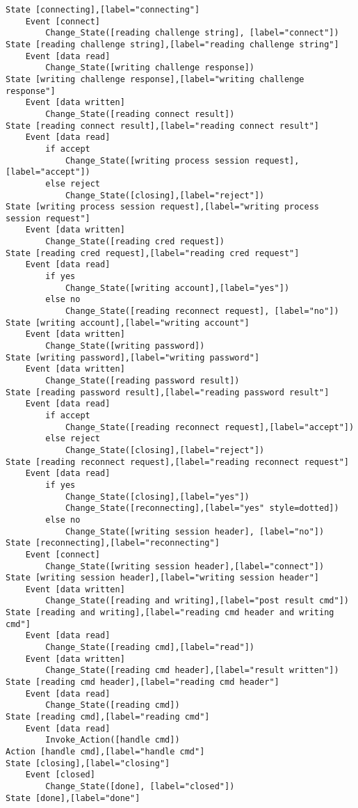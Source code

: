 \begin{comment}
This is the state machine for the smpd connect command.
Graph [smpd connect],
      [size="7.5, 10"]
\end{comment}
\begin{verbatim}
State [connecting],[label="connecting"]
	Event [connect]
		Change_State([reading challenge string], [label="connect"])
State [reading challenge string],[label="reading challenge string"]
	Event [data read]
		Change_State([writing challenge response])
State [writing challenge response],[label="writing challenge response"]
	Event [data written]
		Change_State([reading connect result])
State [reading connect result],[label="reading connect result"]
	Event [data read]
		if accept
			Change_State([writing process session request],[label="accept"])
		else reject
			Change_State([closing],[label="reject"])
State [writing process session request],[label="writing process session request"]
	Event [data written]
		Change_State([reading cred request])
State [reading cred request],[label="reading cred request"]
	Event [data read]
		if yes
			Change_State([writing account],[label="yes"])
		else no
			Change_State([reading reconnect request], [label="no"])
State [writing account],[label="writing account"]
	Event [data written]
		Change_State([writing password])
State [writing password],[label="writing password"]
	Event [data written]
		Change_State([reading password result])
State [reading password result],[label="reading password result"]
	Event [data read]
		if accept
			Change_State([reading reconnect request],[label="accept"])
		else reject
			Change_State([closing],[label="reject"])
State [reading reconnect request],[label="reading reconnect request"]
	Event [data read]
		if yes
			Change_State([closing],[label="yes"])
			Change_State([reconnecting],[label="yes" style=dotted])
		else no
			Change_State([writing session header], [label="no"])
State [reconnecting],[label="reconnecting"]
	Event [connect]
		Change_State([writing session header],[label="connect"])
State [writing session header],[label="writing session header"]
	Event [data written]
		Change_State([reading and writing],[label="post result cmd"])
State [reading and writing],[label="reading cmd header and writing cmd"]
	Event [data read]
		Change_State([reading cmd],[label="read"])
	Event [data written]
		Change_State([reading cmd header],[label="result written"])
State [reading cmd header],[label="reading cmd header"]
	Event [data read]
		Change_State([reading cmd])
State [reading cmd],[label="reading cmd"]
	Event [data read]
		Invoke_Action([handle cmd])
Action [handle cmd],[label="handle cmd"]
State [closing],[label="closing"]
	Event [closed]
		Change_State([done], [label="closed"])
State [done],[label="done"]
\end{verbatim}
